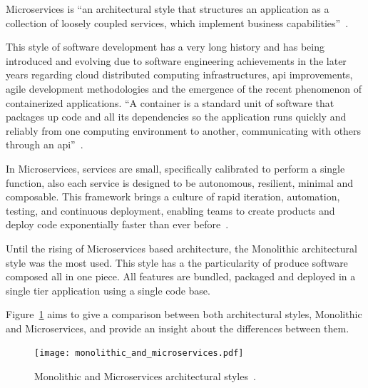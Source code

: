 Microservices is ``an architectural style that structures an application as a collection of loosely coupled services, which implement business capabilities''~\cite{Dragoni2017, microservices_definition}.

This style of software development has a very long history and has being introduced and evolving due to software engineering achievements in the later years regarding cloud distributed computing infrastructures, \gls{api} improvements, agile development methodologies and the emergence of the recent phenomenon of containerized applications. ``A container is a standard unit of software that packages up code and all its dependencies so the application runs quickly and reliably from one computing environment to another, communicating with others through an \gls{api}''~\cite{Pahl2017}.

In Microservices, services are small, specifically calibrated to perform a single function, also each service is designed to be autonomous, resilient, minimal and composable. This framework brings a culture of rapid iteration, automation, testing, and continuous deployment, enabling teams to create products and deploy code exponentially faster than ever before~\cite{Newman}.


Until the rising of Microservices based architecture, the Monolithic architectural style was the most used. This style has a the particularity of produce software composed all in one piece. All features are bundled, packaged and deployed in a single tier application using a single code base.

Figure~\ref{fig:monolithic_and_microservices} aims to give a comparison between both architectural styles, Monolithic and Microservices, and provide an insight about the differences between them.

\begin{figure}[H]
    \centering
    \texttt{[image: monolithic\_and\_microservices.pdf]}
    \caption{Monolithic and Microservices architectural styles~\cite{microservices}.}
    \label{fig:monolithic_and_microservices}
\end{figure}

